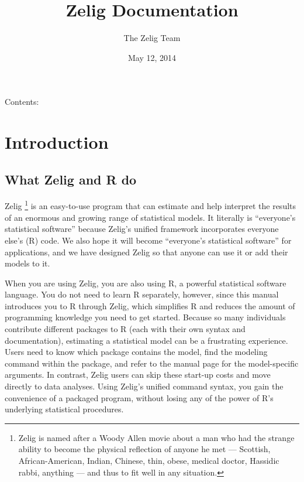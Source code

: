 \documentclass[letterpaper,10pt,english]{sphinxmanual}
\title{Zelig Documentation}
\date{May 12, 2014}
\author{The Zelig Team}
\begin{document}
\maketitle
\tableofcontents
{}\label{index::doc}


Contents:


\chapter{Introduction}
\label{1_introduction:introduction}\label{1_introduction:welcome-to-zelig-s-documentation}\label{1_introduction::doc}

\section{What Zelig and R do}
\label{1_introduction:what-zelig-and-r-do}
Zelig \footnote{
Zelig is named after a Woody Allen movie about a man who had the strange ability to become the physical reflection of anyone he met --- Scottish, African-American, Indian, Chinese, thin, obese, medical doctor, Hassidic rabbi, anything --- and thus to fit well in any situation.
} is an easy-to-use program that can estimate and help interpret the results of an enormous and growing range of statistical models. It literally is “everyone’s statistical software” because Zelig’s unified framework incorporates everyone else’s (R) code. We also hope it will become “everyone’s statistical software” for applications, and we have designed Zelig so that anyone can use it or add their models to it.

When you are using Zelig, you are also using R, a powerful statistical software language. You do not need to learn R separately, however, since this manual introduces you to R through Zelig, which simplifies R and reduces the amount of programming knowledge you need to get started. Because so many individuals contribute different packages to R (each with their own syntax and documentation), estimating a statistical model can be a frustrating experience. Users need to know which package contains the model, find the modeling command within the package, and refer to the manual page for the model-specific arguments. In contrast, Zelig users can skip these start-up costs and move directly to data analyses. Using Zelig’s unified command syntax, you gain the convenience of a packaged program, without losing any of the power of R’s underlying statistical procedures.
\end{document}
